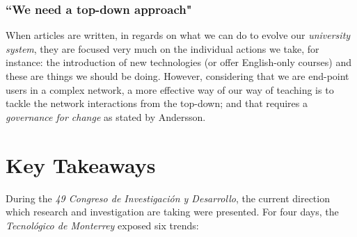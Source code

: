 \documentclass[11pt,a4paper]{article}
\begin{document}










\subsubsection*{``We need a top-down approach"}
When articles are written, in regards on what we can do to evolve our \emph{university system}, they are focused very much on the individual actions we take, for instance: the introduction of new technologies (or offer English-only courses) and these are things we should be doing. However, considering that we are end-point users in a complex network, a more effective way of our way of teaching is to tackle the network interactions from the top-down; and that requires a \emph{governance for change} as stated by Andersson.

\clearpage

\section{Key Takeaways}\label{sec:app}
During the \emph{49 Congreso de Investigación y Desarrollo}, the current direction which research and investigation are taking were presented. For four days, the \emph{Tecnológico de Monterrey} exposed six trends:
\end{document}
